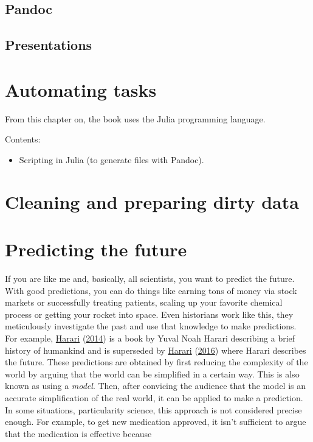 \documentclass[
  14pt
  american,
  paper=a4,
  ,captions=tableheading
]{scrbook}
\providecommand{\tightlist}{%
  \setlength{\itemsep}{0pt}\setlength{\parskip}{0pt}}
\begin{document}
\hypertarget{pandoc}{%
\section{Pandoc}\label{pandoc}}

\hypertarget{presentations}{%
\section{Presentations}\label{presentations}}

\hypertarget{sec:julia}{%
\chapter{Automating tasks}\label{sec:julia}}

From this chapter on, the book uses the Julia programming language.

Contents:

\begin{itemize}
\tightlist
\item
  Scripting in Julia (to generate files with Pandoc).
\end{itemize}

\hypertarget{sec:data}{%
\chapter{Cleaning and preparing dirty data}\label{sec:data}}

\hypertarget{sec:statistics}{%
\chapter{Predicting the future}\label{sec:statistics}}

If you are like me and, basically, all scientists, you want to predict
the future. With good predictions, you can do things like earning tons
of money via stock markets or successfully treating patients, scaling up
your favorite chemical process or getting your rocket into space. Even
historians work like this, they meticulously investigate the past and
use that knowledge to make predictions. For example,
\protect\hyperlink{ref-harari2014sapiens}{Harari}
(\protect\hyperlink{ref-harari2014sapiens}{2014}) is a book by Yuval
Noah Harari describing a brief history of humankind and is superseded by
\protect\hyperlink{ref-harari2016homo}{Harari}
(\protect\hyperlink{ref-harari2016homo}{2016}) where Harari describes
the future. These predictions are obtained by first reducing the
complexity of the world by arguing that the world can be simplified in a
certain way. This is also known as using a \emph{model}. Then, after
convicing the audience that the model is an accurate simplification of
the real world, it can be applied to make a prediction. In some
situations, particularity science, this approach is not considered
precise enough. For example, to get new medication approved, it isn't
sufficient to argue that the medication is effective because
\end{document}
